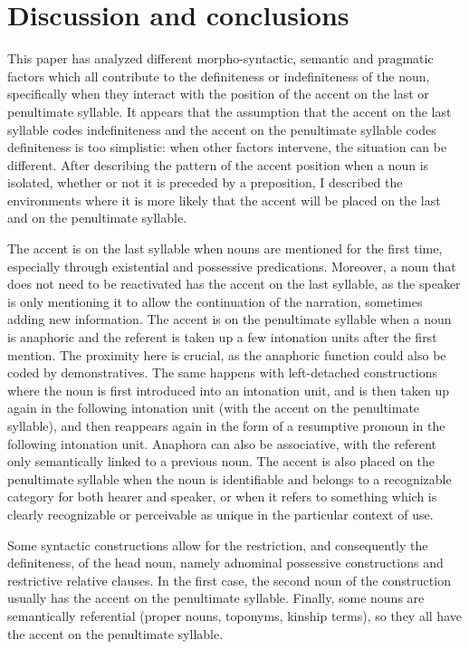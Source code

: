 \documentclass[output=paper]{langsci/langscibook}
\begin{document}
\section{Discussion and conclusions}\label{5sec:5}

This paper has analyzed different morpho-syntactic, semantic and pragmatic factors which all contribute to the definiteness or indefiniteness of the noun, specifically when they interact with the position of the accent on the last or penultimate syllable. It appears that the assumption that the accent on the last syllable codes indefiniteness and the accent on the penultimate syllable codes definiteness is too simplistic: when other factors intervene, the situation can be different. After describing the pattern of the accent position when a noun is isolated, whether or not it is preceded by a preposition, I described the environments where it is more likely that the accent will be placed on the last and on the penultimate syllable.

{
The accent is on the last syllable when nouns are mentioned for the first time, especially through existential and possessive predications. Moreover, a noun that does not need to be reactivated has the accent on the last syllable, as the speaker is only mentioning it to allow the continuation of the narration, sometimes adding new information. The accent is on the penultimate syllable when a noun is anaphoric and the referent is taken up a few intonation units after the first mention. The proximity here is crucial, as the anaphoric function could also be coded by demonstratives. The same happens with left-detached constructions where the noun is first introduced into an intonation unit, and is then taken up again in the following intonation unit (with the accent on the penultimate syllable), and then reappears again in the form of a resumptive pronoun in the following intonation unit. Anaphora can also be associative, with the referent only semantically linked to a previous noun. The accent is also placed on the penultimate syllable when the noun is identifiable and belongs to a recognizable category for both hearer and speaker, or when it refers to something which is clearly recognizable or perceivable as unique in the particular context of use.
}

Some syntactic constructions allow for the restriction, and consequently the definiteness, of the head noun, namely adnominal possessive constructions and restrictive relative clauses. In the first case, the second noun of the construction usually has the accent on the penultimate syllable. Finally, some nouns are semantically referential (proper nouns, toponyms, kinship terms), so they all have the accent on the penultimate syllable.
\end{document}
